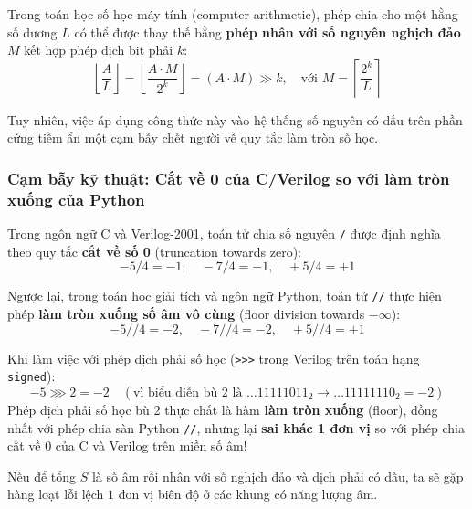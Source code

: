 Trong toán học số học máy tính (computer arithmetic), phép chia cho một hằng số dương $L$ có thể được thay thế bằng \textbf{phép nhân với số nguyên nghịch đảo $M$} kết hợp phép dịch bit phải $k$:
\begin{equation}
\left\lfloor \frac{A}{L} \right\rfloor = \left\lfloor \frac{A \cdot M}{2^k} \right\rfloor = (A \cdot M) \gg k, \quad \text{với } M = \left\lceil \frac{2^k}{L} \right\rceil
\end{equation}

Tuy nhiên, việc áp dụng công thức này vào hệ thống số nguyên có dấu trên phần cứng tiềm ẩn một cạm bẫy chết người về quy tắc làm tròn số học.

\subsubsection*{Cạm bẫy kỹ thuật: Cắt về 0 của C/Verilog so với làm tròn xuống của Python}
Trong ngôn ngữ C và Verilog-2001, toán tử chia số nguyên \texttt{/} được định nghĩa theo quy tắc \textbf{cắt về số 0} (truncation towards zero):
\begin{equation}
-5 / 4 = -1, \quad -7 / 4 = -1, \quad +5 / 4 = +1
\end{equation}

Ngược lại, trong toán học giải tích và ngôn ngữ Python, toán tử \texttt{//} thực hiện phép \textbf{làm tròn xuống số âm vô cùng} (floor division towards $-\infty$):
\begin{equation}
-5 // 4 = -2, \quad -7 // 4 = -2, \quad +5 // 4 = +1
\end{equation}

Khi làm việc với phép dịch phải số học (\texttt{>>>} trong Verilog trên toán hạng \texttt{signed}):
\begin{equation}
-5 \ggg 2 = -2 \quad (\text{vì biểu diễn bù 2 là } \dots 11111011_2 \to \dots 11111110_2 = -2)
\end{equation}
Phép dịch phải số học bù 2 thực chất là hàm \textbf{làm tròn xuống} (floor), đồng nhất với phép chia sàn Python \texttt{//}, nhưng lại \textbf{sai khác 1 đơn vị} so với phép chia cắt về $0$ của C và Verilog trên miền số âm!

Nếu để tổng $S$ là số âm rồi nhân với số nghịch đảo và dịch phải có dấu, ta sẽ gặp hàng loạt lỗi lệch $1$ đơn vị biên độ ở các khung có năng lượng âm.

